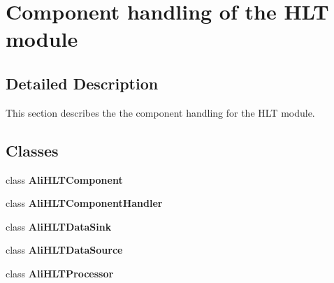 \section{Component handling of the HLT module}
\label{group__alihlt__component}


\subsection{Detailed Description}
This section describes the the component handling for the HLT module. 

\subsection*{Classes}
\begin{CompactItemize}
\item 
class {\bf Ali\-HLTComponent}
\item 
class {\bf Ali\-HLTComponent\-Handler}
\item 
class {\bf Ali\-HLTData\-Sink}
\item 
class {\bf Ali\-HLTData\-Source}
\item 
class {\bf Ali\-HLTProcessor}
\end{CompactItemize}
